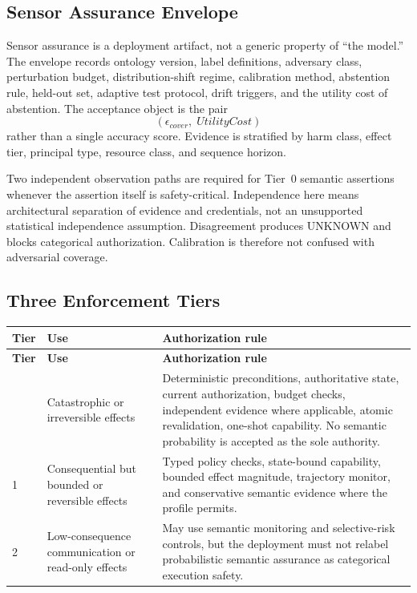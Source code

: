 \documentclass[11pt]{article}
\def\ensuremath#1{#1}%
\def\mathrm#1{#1}%
\def\mathsf#1{#1}%
\newcommand{\epscover}{\ensuremath{\epsilon_{\mathrm{cover}}}}
\newcommand{\UNKNOWN}{\ensuremath{\mathsf{UNKNOWN}}}
\begin{document}
\subsection{Sensor Assurance Envelope}
Sensor assurance is a deployment artifact, not a generic property of ``the model.'' The envelope records ontology version, label definitions, adversary class, perturbation budget, distribution-shift regime, calibration method, abstention rule, held-out set, adaptive test protocol, drift triggers, and the utility cost of abstention. The acceptance object is the pair
\[
(\epscover,\; \mathrm{UtilityCost})
\]
rather than a single accuracy score. Evidence is stratified by harm class, effect tier, principal type, resource class, and sequence horizon.

Two independent observation paths are required for Tier~0 semantic assertions whenever the assertion itself is safety-critical. Independence here means architectural separation of evidence and credentials, not an unsupported statistical independence assumption. Disagreement produces \UNKNOWN{} and blocks categorical authorization. Calibration is therefore not confused with adversarial coverage.

\subsection{Three Enforcement Tiers}
\begin{longtable}{@{}L{1.8cm} L{4.0cm} L{8.8cm}@{}}
\toprule
\textbf{Tier} & \textbf{Use} & \textbf{Authorization rule}\\
\midrule
\endfirsthead
\toprule
\textbf{Tier} & \textbf{Use} & \textbf{Authorization rule}\\
\midrule
\endhead
\bottomrule
{} & Catastrophic or irreversible effects & Deterministic preconditions, authoritative state, current authorization, budget checks, independent evidence where applicable, atomic revalidation, one-shot capability. No semantic probability is accepted as the sole authority. \\
1 & Consequential but bounded or reversible effects & Typed policy checks, state-bound capability, bounded effect magnitude, trajectory monitor, and conservative semantic evidence where the profile permits. \\
2 & Low-consequence communication or read-only effects & May use semantic monitoring and selective-risk controls, but the deployment must not relabel probabilistic semantic assurance as categorical execution safety. \\
\end{longtable}
\end{document}
